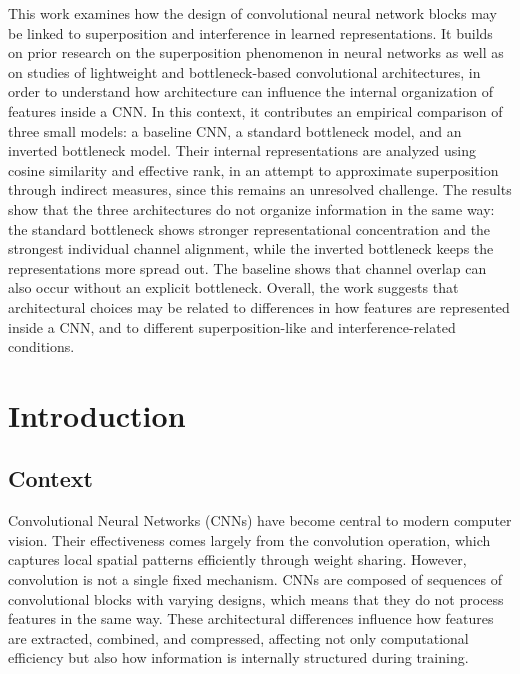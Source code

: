 \documentclass[12pt,a4paper]{report}
\begin{document}
This work examines how the design of convolutional neural network blocks may be linked
to superposition and interference in learned representations. It builds on prior research
on the superposition phenomenon in neural networks as well as on studies of lightweight
and bottleneck-based convolutional architectures, in order to understand how architecture
can influence the internal organization of features inside a CNN. In this context, it
contributes an empirical comparison of three small models: a baseline CNN, a standard
bottleneck model, and an inverted bottleneck model. Their internal representations are
analyzed using cosine similarity and effective rank, in an attempt to approximate
superposition through indirect measures, since this remains an unresolved challenge. The
results show that the three architectures do not organize information in the same way:
the standard bottleneck shows stronger representational concentration and the strongest
individual channel alignment, while the inverted bottleneck keeps the representations
more spread out. The baseline shows that channel overlap can also occur without an
explicit bottleneck. Overall, the work suggests that architectural choices may be related
to differences in how features are represented inside a CNN, and to different superposition-like
and interference-related conditions.

\vspace*{\fill}
\clearpage

\tableofcontents
\clearpage

\hypersetup{pageanchor=true}

\section{Introduction}

\subsection{Context}
Convolutional Neural Networks (CNNs) have become central to modern computer vision. Their effectiveness comes largely from the convolution operation, which captures local spatial patterns efficiently through weight sharing. However, convolution is not a single fixed mechanism. CNNs are composed of sequences of convolutional blocks with varying designs, which means that they do not process features in the same way. These architectural differences influence how features are extracted, combined, and compressed, affecting not only computational efficiency but also how information is internally structured during training.
\end{document}

